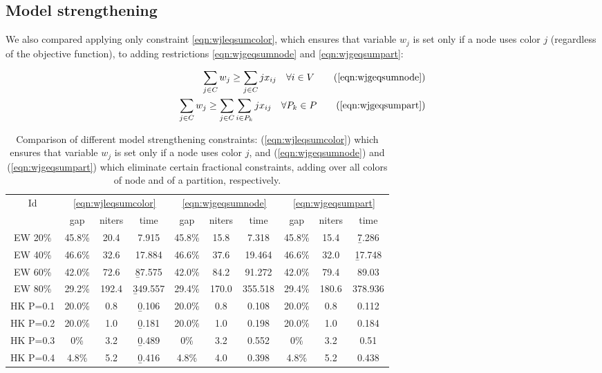 \subsection{Model strengthening}

We also compared applying only constraint \ref{eqn:wjleqsumcolor}, which ensures that variable $w_j$ is set only if a node uses color $j$ (regardless of the objective function), to adding restrictions \ref{eqn:wjgeqsumnode} and \ref{eqn:wjgeqsumpart}:

\begin{align*}
\sum_{j \in C} w_j \geq \sum_{j \in C} j x_{ij} \quad \forall i \in V \tag{\ref{eqn:wjgeqsumnode}} \\
\sum_{j \in C} w_j \geq \sum_{j \in C} \sum_{i \in P_k} j x_{ij} \quad \forall P_k \in P \tag{\ref{eqn:wjgeqsumpart}}
\end{align*}

\begin{table}
\centering

\begin{tabular}{|c|ccc|ccc|ccc|}
\hline
\multicolumn{1}{|c|}{Id} & \multicolumn{3}{|c|}{\ref{eqn:wjleqsumcolor}} & \multicolumn{3}{|c|}{\ref{eqn:wjgeqsumnode}} & \multicolumn{3}{|c|}{\ref{eqn:wjgeqsumpart}}
\\
 & gap & niters & time & gap & niters & time & gap & niters & time
\\
\hline
EW 20\% &45.8\% & 20.4 & 7.915 &45.8\% & 15.8 & 7.318 &45.8\% & 15.4 & \b{7.286}
\\
EW 40\% &46.6\% & 32.6 & 17.884 &46.6\% & 37.6 & 19.464 &46.6\% & 32.0 & \b{17.748}
\\
EW 60\% & 42.0\% & 72.6 & \b{87.575} & 42.0\% & 84.2 & 91.272 & 42.0\% & 79.4 & 89.03
\\
EW 80\% &29.2\% & 192.4 & \b{349.557} &29.4\% & 170.0 & 355.518 &29.4\% & 180.6 & 378.936
\\
\hline
HK P=0.1 &  20.0\% &  0.8 & \b{0.106} &  20.0\% &  0.8 & 0.108 &  20.0\% &  0.8 & 0.112
\\
HK P=0.2 &  20.0\% &  1.0 & \b{0.181} &  20.0\% &  1.0 & 0.198 &  20.0\% &  1.0 & 0.184
\\
HK P=0.3 & 0\% &  3.2 & \b{0.489} & 0\% &  3.2 & 0.552 & 0\% &  3.2 & 0.51
\\
HK P=0.4 & 4.8\% &  5.2 & \b{0.416} & 4.8\% &  4.0 & 0.398 & 4.8\% &  5.2 & 0.438
\\
\hline 
 \end{tabular}

\caption{Comparison of different model strengthening constraints: (\ref{eqn:wjleqsumcolor}) which ensures that variable $w_j$ is set only if a node uses color $j$, and (\ref{eqn:wjgeqsumnode}) and (\ref{eqn:wjgeqsumpart}) which eliminate certain fractional constraints, adding over all colors of node and of a partition, respectively.}

\label{table:models:colorbound}

\end{table}

